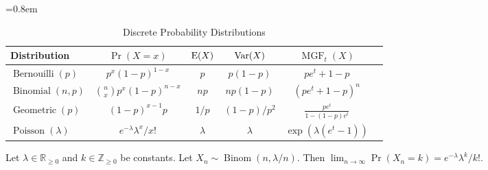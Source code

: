 \documentclass[a4paper, 12pt, fleqn]{article}
\DeclareMathOperator{\MGF}{MGF}
\begin{document}
\begin{table}[!ht]
\centering
\caption{Discrete Probability Distributions}
=0.8em
\abovetopsep=4pt
\begin{tabular}{lccccc}
\toprule Distribution
    & $\Pr(X = x)$
    & $\operatorname*{E}(X)$
    & $\operatorname*{Var}(X)$
    & $\MGF_t(X)$
\\ \midrule $\operatorname{Bernouilli}(p)$
    & $p^x(1-p)^{1-x}$
    & $p$
    & $p(1-p)$
    & $pe^t + 1-p$
\\[\defaultaddspace] $\operatorname{Binomial}(n, p)$
    & $\displaystyle \binom{n}{x}p^x(1-p)^{n-x}$
    & $np$
    & $np(1-p)$
    & $(pe^t + 1-p)^n$
\\[\defaultaddspace] $\operatorname{Geometric}(p)$
    & $(1-p)^{x-1}p$
    & $1/p$
    & $(1-p)/p^2$
    & $\displaystyle \frac{pe^t}{1-(1-p)e^t}$
\\[\defaultaddspace] $\operatorname{Poisson}(\lambda)$
    & $e^{-\lambda}\lambda^x/x!$
    & $\lambda$
    & $\lambda$
    & $\displaystyle \exp(\lambda(e^t-1))$
\\ \bottomrule
\end{tabular}
\label{table:disc-distr}
\end{table}

\begin{theorem}
Let $\lambda \in \mathbb{R}_{\ge 0}$ and $k \in \mathbb{Z}_{\ge 0}$ be constants.
Let $X_n \sim \operatorname{Binom}(n, \lambda/n)$.
Then $\lim_{n \to \infty} \Pr(X_n = k) = e^{-\lambda}\lambda^k/k!$.
\end{theorem}
\end{document}

